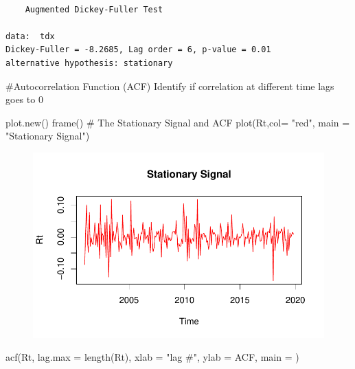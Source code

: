 \documentclass[
  letterpaper,
  DIV=11,
  numbers=noendperiod]{scrartcl}
\newenvironment{Shaded}{\begin{snugshade}}{\end{snugshade}}
\newcommand{\AttributeTok}[1]{\textcolor[rgb]{0.40,0.45,0.13}{#1}}
\newcommand{\CommentTok}[1]{\textcolor[rgb]{0.37,0.37,0.37}{#1}}
\newcommand{\FunctionTok}[1]{\textcolor[rgb]{0.28,0.35,0.67}{#1}}
\newcommand{\NormalTok}[1]{\textcolor[rgb]{0.00,0.23,0.31}{#1}}
\newcommand{\StringTok}[1]{\textcolor[rgb]{0.13,0.47,0.30}{#1}}
\begin{document}
\begin{verbatim}

    Augmented Dickey-Fuller Test

data:  tdx
Dickey-Fuller = -8.2685, Lag order = 6, p-value = 0.01
alternative hypothesis: stationary
\end{verbatim}

\#Autocorrelation Function (ACF) Identify if correlation at different
time lags goes to 0

\begin{Shaded}
\begin{Highlighting}[]
\FunctionTok{plot.new}\NormalTok{()}
\FunctionTok{frame}\NormalTok{()}
\CommentTok{\# The Stationary Signal and ACF}
\FunctionTok{plot}\NormalTok{(Rt,}\AttributeTok{col=} \StringTok{"red"}\NormalTok{, }\AttributeTok{main =} \StringTok{"Stationary Signal"}\NormalTok{)}
\end{Highlighting}
\end{Shaded}

\begin{figure}[H]

{\centering \includegraphics{Quarto_files/figure-pdf/unnamed-chunk-17-1.pdf}

}

\end{figure}

\begin{Shaded}
\begin{Highlighting}[]
\FunctionTok{acf}\NormalTok{(Rt, }\AttributeTok{lag.max =} \FunctionTok{length}\NormalTok{(Rt),}
    \AttributeTok{xlab =} \StringTok{"lag \#"}\NormalTok{, }\AttributeTok{ylab =} \StringTok{\textquotesingle{}ACF\textquotesingle{}}\NormalTok{, }\AttributeTok{main =} \StringTok{\textquotesingle{}\textquotesingle{}}\NormalTok{)}
\end{Highlighting}
\end{Shaded}
\end{document}
